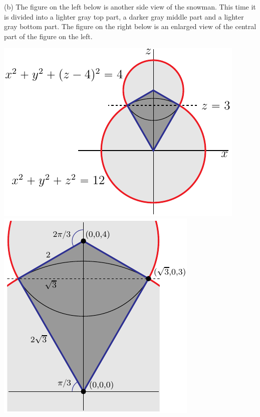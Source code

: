 \begin{solution}
(b) The figure on the left below is another side view of the snowman.
This time it is divided into a lighter gray top part, a darker gray
middle part and a lighter gray bottom part. The figure on the
right below is an enlarged view of the central part of the figure on the
left.
\begin{center}
     \includegraphics{fig/OE11D_8b.pdf}\qquad
     \includegraphics{fig/OE11D_8c.pdf}
\end{center}


\end{solution}
